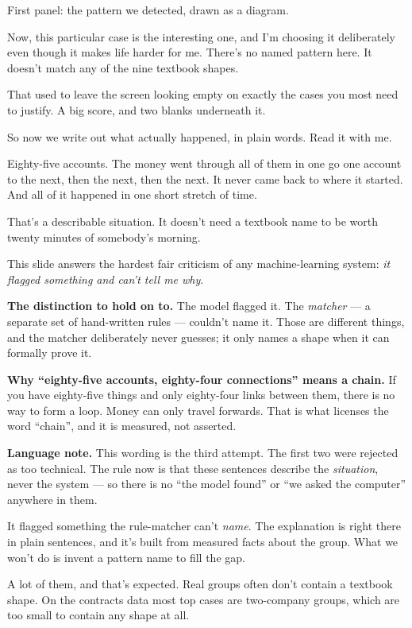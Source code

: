 \documentclass[11pt]{article}
\begin{document}
\begin{saythis}
First panel: the pattern we detected, drawn as a diagram.

Now, this particular case is the interesting one, and I'm choosing it
deliberately even though it makes life harder for me. There's no named pattern
here. It doesn't match any of the nine textbook shapes.

That used to leave the screen looking empty on exactly the cases you most need
to justify. A big score, and two blanks underneath it.

So now we write out what actually happened, in plain words. Read it with me.

Eighty-five accounts. The money went through all of them in one go \bt one
account to the next, then the next, then the next. It never came back to where
it started. And all of it happened in one short stretch of time.

That's a describable situation. It doesn't need a textbook name to be worth
twenty minutes of somebody's morning.
\end{saythis}

\begin{means}
This slide answers the hardest fair criticism of any machine-learning system:
\emph{it flagged something and can't tell me why}.

\textbf{The distinction to hold on to.} The model flagged it. The
\emph{matcher} --- a separate set of hand-written rules --- couldn't name it.
Those are different things, and the matcher deliberately never guesses; it
only names a shape when it can formally prove it.

\textbf{Why ``eighty-five accounts, eighty-four connections'' means a chain.}
If you have eighty-five things and only eighty-four links between them, there
is no way to form a loop. Money can only travel forwards. That is what licenses
the word ``chain'', and it is measured, not asserted.

\textbf{Language note.} This wording is the third attempt. The first two were
rejected as too technical. The rule now is that these sentences describe the
\emph{situation}, never the system --- so there is no ``the model found'' or
``we asked the computer'' anywhere in them.
\end{means}

\begin{asked}
 It flagged something the
rule-matcher can't \emph{name}. The explanation is right there in plain
sentences, and it's built from measured facts about the group. What we won't do
is invent a pattern name to fill the gap.

 A lot of them, and that's expected.
Real groups often don't contain a textbook shape. On the contracts data most
top cases are two-company groups, which are too small to contain any shape at
all.
\end{asked}
\end{document}

